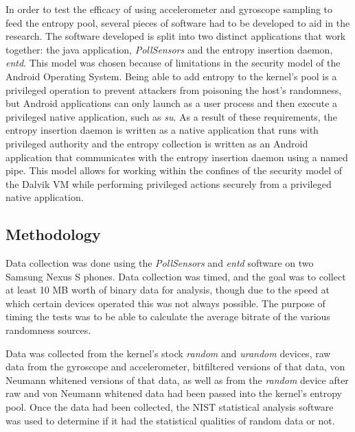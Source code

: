 In order to test the efficacy of using accelerometer and gyroscope sampling to
feed the entropy pool, several pieces of software had to be developed to aid in
the research. The software developed is split into two distinct applications
that work together: the java application, \textit{PollSensors} and the entropy
insertion daemon, \textit{entd}. This model was chosen because of limitations in
the security model of the Android Operating System. Being able to add entropy to
the kernel's pool is a privileged operation to prevent attackers from poisoning
the host's randomness, but Android applications can only launch as a user
process and then execute a privileged native application, such as \textit{su}.
As a result of these requirements, the entropy insertion daemon is written as a
native application that runs with privileged authority and the entropy
collection is written as an Android application that communicates with the
entropy insertion daemon using a named pipe. This model allows for working
within the confines of the security model of the Dalvik VM while performing
privileged actions securely from a privileged native application.

\subsection{Methodology}

Data collection was done using the \textit{PollSensors} and \textit{entd}
software on two Samsung Nexus S phones. Data collection was timed, and the goal
was to collect at least 10 MB worth of binary data for analysis, though due to
the speed at which certain devices operated this was not always possible. The
purpose of timing the tests was to be able to calculate the average bitrate of
the various randomness sources.

Data was collected from the kernel's stock \textit{random} and \textit{urandom}
devices, raw data from the gyroscope and accelerometer, bitfiltered versions of
that data, von Neumann whitened versions of that data, as well as from the
\textit{random} device after raw and von Neumann whitened data had been passed
into the kernel's entropy pool. Once the data had been collected, the NIST
statistical analysis software was used to determine if it had the statistical
qualities of random data or not.

